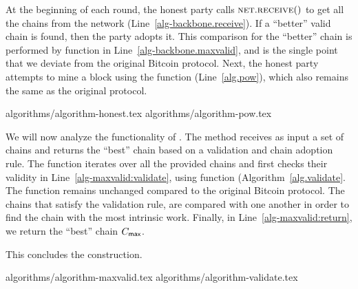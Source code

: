 At the beginning of each round, the honest party calls $\textsc{net}.\textsc{receive}()$ to get all
the chains from the network (Line~\ref{alg-backbone.receive}). If a ``better''
valid chain is found, then the party adopts it.
This comparison for the ``better'' chain is performed by
function \maxvalid in Line~\ref{alg-backbone.maxvalid}, and
is the single point that we deviate from the original Bitcoin protocol.
Next, the honest party attempts to mine a block using the \pow function (Line~\ref{alg.pow}),
which also remains the same as the original protocol.

{algorithms/algorithm-honest.tex}
{algorithms/algorithm-pow.tex}

We will now analyze the functionality of \maxvalid. The method receives as input
a set of chains and returns the ``best'' chain based on a validation and
chain adoption rule. The function iterates over all the provided chains
and first checks their validity in Line~\ref{alg-maxvalid:validate}, using
function \validate (Algorithm~\ref{alg.validate}. The \validate function remains unchanged compared to
the original Bitcoin protocol.
The chains that satisfy the validation rule,
are compared with one another in order to find the chain
with the most intrinsic work. Finally, in Line~\ref{alg-maxvalid:return}, we return the
``best'' chain $C_{\textsf{max}}$.

This concludes the \poem construction.

{algorithms/algorithm-maxvalid.tex}
{algorithms/algorithm-validate.tex}



